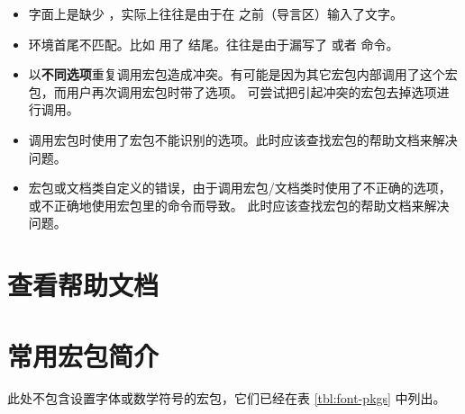 \begin{itemize}
\item {}

字面上是缺少 ，实际上往往是由于在  之前（导言区）输入了文字。

\item {}

环境首尾不匹配。比如  用了  结尾。往往是由于漏写了 
或者  命令。

\item {}

以\textbf{不同选项}重复调用宏包造成冲突。有可能是因为其它宏包内部调用了这个宏包，而用户再次调用宏包时带了选项。
可尝试把引起冲突的宏包去掉选项进行调用。

\item {}

调用宏包时使用了宏包不能识别的选项。此时应该查找宏包的帮助文档来解决问题。

\item {}

宏包或文档类自定义的错误，由于调用宏包/文档类时使用了不正确的选项，或不正确地使用宏包里的命令而导致。
此时应该查找宏包的帮助文档来解决问题。

\end{itemize}

\section{查看帮助文档}\label{sec:texdoc}

\leavevmode\nobreakspace

\section{常用宏包简介}\label{sec:pkg-list}

\def\pkglabel#1{\makebox[60pt][l]{\pkg{#1}}}
\newenvironment{pkglist}%
  {\list{}{%
    \labelwidth=60pt 
    \itemindent=0pt 
    \leftmargin=60pt 
    \labelsep=0pt 
    \let\makelabel\pkglabel}}%
  {\endlist}

此处不包含设置字体或数学符号的宏包，它们已经在表 \ref{tbl:font-pkgs} 中列出。


